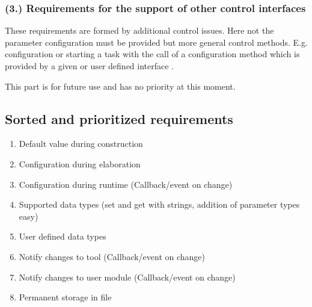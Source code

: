 \subsubsection{(3.) Requirements for the support of other control interfaces}
These requirements are formed by additional control issues. Here not the parameter configuration must be provided but more general control methods. E.g. configuration or starting a task with the call of a configuration method which is provided by a given or user defined interface . 

This part is for future use and has no priority at this moment. 

\subsection{Sorted and prioritized requirements}

\begin{enumerate}
	\item Default value during construction 
	\item Configuration during elaboration 
	\item Configuration during runtime (Callback/event on change) 
	\item Supported data types (set and get with strings, addition of parameter types easy) 
	\item User defined data types 
	\item Notify changes to tool (Callback/event on change) 
	\item Notify changes to user module (Callback/event on change) 
	\item Permanent storage in file 
\end{enumerate}
